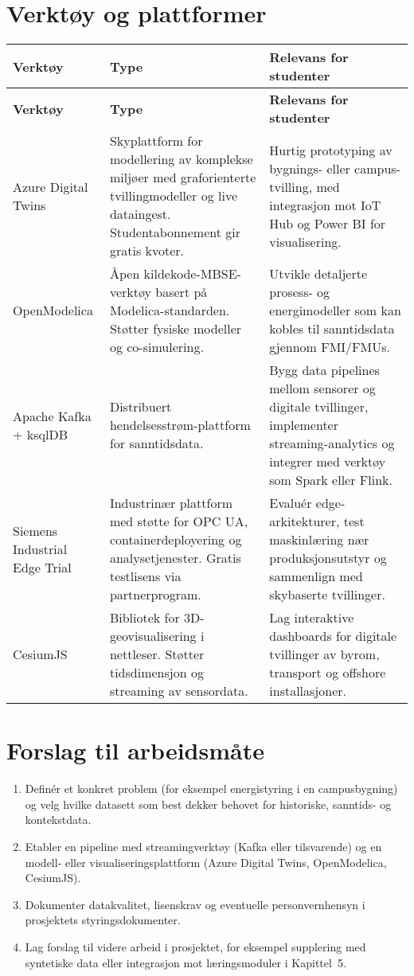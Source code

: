 \section{Verktøy og plattformer}
\begin{longtable}{p{}p{}p{}}
\toprule
\textbf{Verktøy} & \textbf{Type} & \textbf{Relevans for studenter} \\
\midrule
\endfirsthead
\toprule
\textbf{Verktøy} & \textbf{Type} & \textbf{Relevans for studenter} \\
\midrule
\endhead
Azure Digital Twins & Skyplattform for modellering av komplekse miljøer med graforienterte tvillingmodeller og live dataingest. Studentabonnement gir gratis kvoter. & Hurtig prototyping av bygnings- eller campus-tvilling, med integrasjon mot IoT Hub og Power BI for visualisering. \\
\addlinespace
OpenModelica & Åpen kildekode-MBSE-verktøy basert på Modelica-standarden. Støtter fysiske modeller og co-simulering. & Utvikle detaljerte prosess- og energimodeller som kan kobles til sanntidsdata gjennom FMI/FMUs. \\
\addlinespace
Apache Kafka + ksqlDB & Distribuert hendelsesstrøm-plattform for sanntidsdata. & Bygg data pipelines mellom sensorer og digitale tvillinger, implementer streaming-analytics og integrer med verktøy som Spark eller Flink. \\
\addlinespace
Siemens Industrial Edge Trial & Industrinær plattform med støtte for OPC UA, containerdeployering og analysetjenester. Gratis testlisens via partnerprogram. & Evaluér edge-arkitekturer, test maskinlæring nær produksjonsutstyr og sammenlign med skybaserte tvillinger. \\
\addlinespace
CesiumJS & Bibliotek for 3D-geovisualisering i nettleser. Støtter tidsdimensjon og streaming av sensordata. & Lag interaktive dashboards for digitale tvillinger av byrom, transport og offshore installasjoner. \\
\bottomrule
\end{longtable}

\section{Forslag til arbeidsmåte}
\begin{enumerate}
    \item Definér et konkret problem (for eksempel energistyring i en campusbygning) og velg hvilke datasett som best dekker behovet for historiske, sanntids- og kontekstdata.
    \item Etabler en pipeline med streamingverktøy (Kafka eller tilsvarende) og en modell- eller visualiseringsplattform (Azure Digital Twins, OpenModelica, CesiumJS).
    \item Dokumenter datakvalitet, lisenskrav og eventuelle personvernhensyn i prosjektets styringsdokumenter.
    \item Lag forslag til videre arbeid i prosjektet, for eksempel supplering med syntetiske data eller integrasjon mot læringsmoduler i Kapittel~5.
\end{enumerate}

